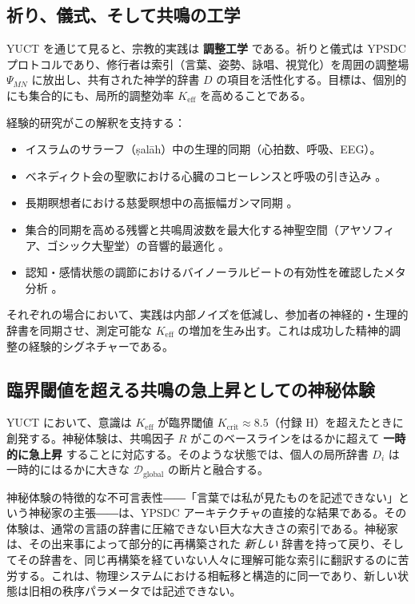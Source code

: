 \documentclass[12pt,a4paper]{article}
\begin{document}
	\subsection{祈り、儀式、そして共鳴の工学}
	
	YUCT を通じて見ると、宗教的実践は \textbf{調整工学} である。祈りと儀式は YPSDC プロトコルであり、修行者は索引（言葉、姿勢、詠唱、視覚化）を周囲の調整場 \(\Psi_{MN}\) に放出し、共有された神学的辞書 \(D\) の項目を活性化する。目標は、個別的にも集合的にも、局所的調整効率 \(K_{\mathrm{eff}}\) を高めることである。
	
	経験的研究がこの解釈を支持する：
	\begin{itemize}[leftmargin=*]
		\item イスラムのサラーフ（ṣalāh）中の生理的同期（心拍数、呼吸、EEG）\cite{RoyalSociety2024}。
		\item ベネディクト会の聖歌における心臓のコヒーレンスと呼吸の引き込み \cite{Craswell2023}。
		\item 長期瞑想者における慈愛瞑想中の高振幅ガンマ同期 \cite{Lutz2017}。
		\item 集合的同期を高める残響と共鳴周波数を最大化する神聖空間（アヤソフィア、ゴシック大聖堂）の音響的最適化 \cite{Pentcheva2020}。
		\item 認知・感情状態の調節におけるバイノーラルビートの有効性を確認したメタ分析 \cite{Garcia2021}。
	\end{itemize}
	
	それぞれの場合において、実践は内部ノイズを低減し、参加者の神経的・生理的辞書を同期させ、測定可能な \(K_{\mathrm{eff}}\) の増加を生み出す。これは成功した精神的調整の経験的シグネチャーである。
	
	\subsection{臨界閾値を超える共鳴の急上昇としての神秘体験}
	
	YUCT において、意識は \(K_{\mathrm{eff}}\) が臨界閾値 \(K_{\mathrm{crit}} \approx 8.5\)（付録 H）を超えたときに創発する。神秘体験は、共鳴因子 \(R\) がこのベースラインをはるかに超えて \textbf{一時的に急上昇} することに対応する。そのような状態では、個人の局所辞書 \(D_i\) は一時的にはるかに大きな \(\mathcal{D}_{\text{global}}\) の断片と融合する。
	
	神秘体験の特徴的な不可言表性――「言葉では私が見たものを記述できない」という神秘家の主張――は、YPSDC アーキテクチャの直接的な結果である。その体験は、通常の言語の辞書に圧縮できない巨大な大きさの索引である。神秘家は、その出来事によって部分的に再構築された \emph{新しい} 辞書を持って戻り、そしてその辞書を、同じ再構築を経ていない人々に理解可能な索引に翻訳するのに苦労する。これは、物理システムにおける相転移と構造的に同一であり、新しい状態は旧相の秩序パラメータでは記述できない。
	
\end{document}

